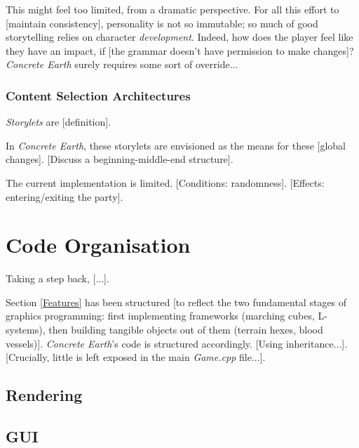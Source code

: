 \documentclass[a4paper, 11pt]{article}
\begin{document}
\begin{flushleft}
\vspace{5pt}

\vspace{5pt}\noindent
This might feel too limited, from a dramatic perspective. For all this effort to [maintain consistency], personality is not so immutable; so much of good storytelling relies on character \textit{development}.
Indeed, how does the player feel like they have an impact, if [the grammar doesn't have permission to make changes]? \textit{Concrete Earth} surely requires some sort of override...

\subsubsection{Content Selection Architectures} \textit{Storylets} \citep{kreminskiStorylets} are [definition].

\vspace{5pt}\noindent
In \textit{Concrete Earth}, these storylets are envisioned as the means for these [global changes]. [Discuss a beginning-middle-end structure].%
 
\vspace{5pt}\noindent
The current implementation is limited. [Conditions: randomness]. [Effects: entering/exiting the party].

\section{Code Organisation}

Taking a step back, [...].

\vspace{5pt}\noindent
Section \ref{Features} has been structured [to reflect the two fundamental stages of graphics programming: first implementing frameworks (marching cubes, L-systems), then building tangible objects out of them (terrain hexes, blood vessels)]. \textit{Concrete Earth}'s code is structured accordingly. [Using inheritance...]. [Crucially, little is left exposed in the main \textit{Game.cpp} file...].


\subsection{Rendering}

\subsection{GUI}


\end{flushleft}
\end{document}

